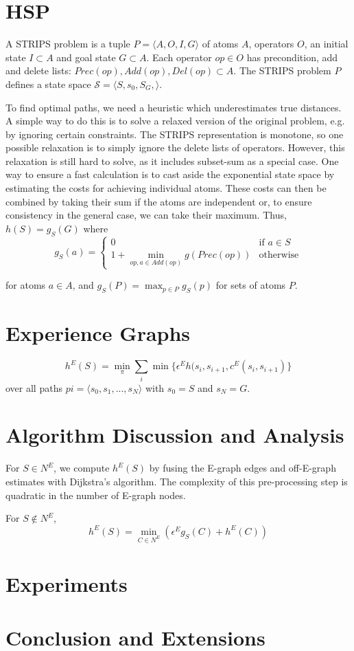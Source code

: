 \documentclass[letterpaper]{article}
\begin{document}
\section{HSP}

A STRIPS problem is a tuple $P = \langle A,O,I,G\rangle$ of atoms $A$, operators $O$, an initial state $I \subset A$ and goal state $G \subset A$. Each operator $op\in O$ has precondition, add and delete lists: $Prec(op),Add(op),Del(op) \subset A$. The STRIPS problem $P$ defines a state space $\mathcal S = \langle S,s_0,S_G,\rangle$.

To find optimal paths, we need a heuristic which underestimates true distances. A simple way to do this is to solve a relaxed version of the original problem, e.g. by ignoring certain constraints. The STRIPS representation is monotone, so one possible relaxation is to simply ignore the delete lists of operators. However, this relaxation is still hard to solve, as it includes subset-sum as a special case. One way to ensure a fast calculation is to cast aside the exponential state space by estimating the costs for achieving individual atoms. These costs can then be combined by taking their sum if the atoms are independent or, to ensure consistency in the general case, we can take their maximum. Thus,
$h(S) = g_S(G)$ where \[g_S(a) = \begin{cases} 0  &\mbox{if } a \in S \\ 1 + \min_{op,a\in Add(op)} g(Prec(op))  &\mbox{otherwise} \end{cases}\]

for atoms $a\in A$, and $g_S(P) = \max_{p\in P} g_S(p)$ for sets of atoms $P$.

\section{Experience Graphs}

\[h^E(S) = \min_\pi \sum_i \min \{\epsilon^E h(s_i,s_{i+1},c^E(s_i,s_{i+1})\}\] over all paths $pi = \langle s_0,s_1,...,s_N \rangle$ with $s_0 = S$ and $s_N = G$.



\section{Algorithm Discussion and Analysis}

For $S\in N^E$, we compute $h^E(S)$ by fusing the E-graph edges and off-E-graph estimates with Dijkstra's algorithm. The complexity of this pre-processing step is quadratic in the number of E-graph nodes.

For $S\notin N^E$, \[h^E(S) = \min_{C\in N^E} \left( \epsilon^E g_S(C) + h^E(C) \right)\]

\section{Experiments}



\section{Conclusion and Extensions}
\end{document}
